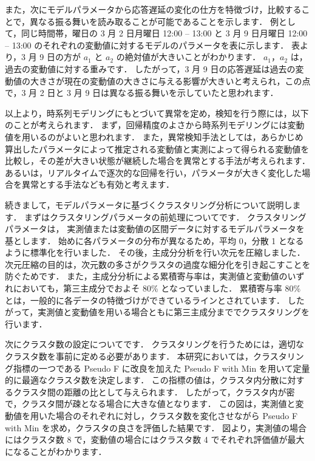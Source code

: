 \documentclass[a4j]{jarticle}
\begin{document}
また，次にモデルパラメータから応答遅延の変化の仕方を特徴づけ，比較することで，異なる振る舞いを読み取ることが可能であることを示します．
例として，同じ時間帯，曜日の 3 月 2 日月曜日 12:00 – 13:00 と 3 月 9 日月曜日 12:00 – 13:00 のそれぞれの変動値に対するモデルのパラメータを表に示します．
表より，3 月 9 日の方が $a_1$ と $a_2$ の絶対値が大きいことがわかります．
$a_1，a_2$ は，過去の変動値に対する重みです．
したがって，3 月 9 日の応答遅延は過去の変動値の大きさが現在の変動値の大きさに与える影響が大きいと考えられ，この点で，3 月 2 日と 3 月 9 日は異なる振る舞いを示していたと思われます．

以上より，時系列モデリングにもとづいて異常を定め，検知を行う際には，以下のことが考えられます．
まず，回帰精度のよさから時系列モデリングには変動値を用いるのがよいと思われます．
また，異常検知手法としては，あらかじめ算出したパラメータによって推定される変動値と実測によって得られる変動値を比較し，その差が大きい状態が継続した場合を異常とする手法が考えられます．
あるいは，リアルタイムで逐次的な回帰を行い，パラメータが大きく変化した場合を異常とする手法なども有効と考えます．

続きまして，モデルパラメータに基づくクラスタリング分析について説明します．
まずはクラスタリングパラメータの前処理についてです．
クラスタリングパラメータは， 実測値または変動値の区間データに対するモデルパラメータを基とします．
始めに各パラメータの分布が異なるため，平均 0，分散 1 となるように標準化を行いました．
その後，主成分分析を行い次元を圧縮しました．
次元圧縮の目的は，次元数の多さがクラスタの過度な細分化を引き起こすことを防ぐためです．
また，主成分分析による累積寄与率は，実測値と変動値のいずれにおいても，第三主成分でおよそ 80\% となっていました．
累積寄与率 80\% とは，一般的に各データの特徴づけができているラインとされています．
したがって，実測値と変動値を用いる場合ともに第三主成分まででクラスタリングを行います．

次にクラスタ数の設定についてです．
クラスタリングを行うためには，適切なクラスタ数を事前に定める必要があります．
本研究においては，クラスタリング指標の一つである Pseudo F に改良を加えた Pseudo F with Min を用いて定量的に最適なクラスタ数を決定します．
この指標の値は，クラスタ内分散に対するクラスタ間の距離の比として与えられます．
したがって，クラスタ内が密で，クラスタ間が疎となる場合に大きな値となります．
この図は，実測値と変動値を用いた場合のそれぞれに対し，クラスタ数を変化させながら Pseudo F with Min を求め，クラスタの良さを評価した結果です．
図より，実測値の場合にはクラスタ数 8 で，変動値の場合にはクラスタ数 4 でそれぞれ評価値が最大になることがわかります．
\end{document}
